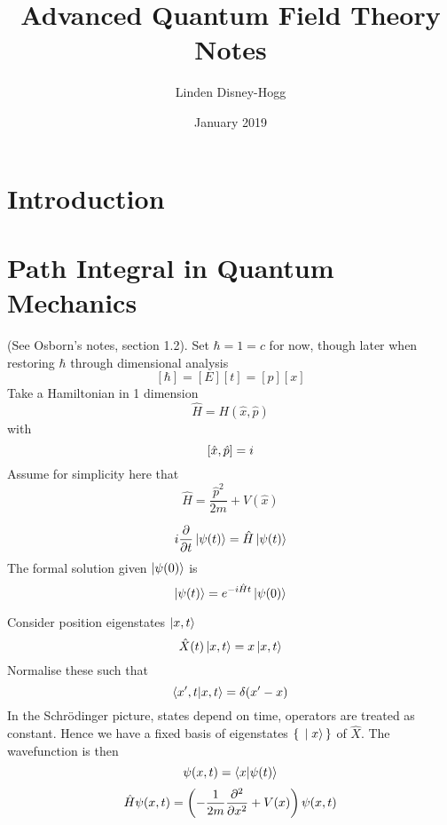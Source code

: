 \documentclass{article}
\title{Advanced Quantum Field Theory Notes}
\author{Linden Disney-Hogg}
\date{January 2019}
\begin{document}
\maketitle
\tableofcontents

\section{Introduction}
\section{Path Integral in Quantum Mechanics}
(See Osborn's notes, section 1.2). Set $\hbar = 1 = c$ for now, though later when restoring $\hbar$ through dimensional analysis 
\[
[\hbar]=[E][t]=[p][x]
\]
Take a Hamiltonian in 1 dimension 
\[
\hat{H} = H(\hat{x},\hat{p})
\]
with 
\[
\comm[\hat{x}]{\hat{p}}=i
\]
Assume for simplicity here that 
\[
\hat{H} = \frac{\hat{p}^2}{2m} + V(\hat{x})
\]
\begin{definition}
\[
i \pd{t} \ket{\psi(t)} = \hat{H} \ket{\psi(t)}
\]
The formal solution given $\ket{\psi(0)}$ is 
\[
\ket{\psi(t)} = e^{-i\hat{H}t} \ket{\psi(0)}
\]
\end{definition}

Consider position eigenstates $\ket{x,t}$
\[
\hat{X}(t) \ket{x,t} = x\ket{x,t} 
\]
Normalise these such that 
\[
\braket{x^\prime, t| x,t} = \delta(x^\prime - x)
\]
In the Schr\"odinger picture, states depend on time, operators are treated as constant. Hence we have a fixed basis of eigenstates $\set{\ket{x}}$ of $\hat{X}$. The wavefunction is then 
\[
\psi(x,t) = \braket{x | \psi(t)}
\]
\[
\hat{H}\psi(x,t) = \left( -\frac{1}{2m} \pds{x} +V(x) \right) \psi(x,t)
\]

\end{document}
